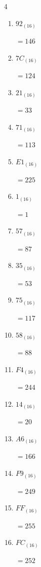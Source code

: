 \begin{multicols}{4}
\begin{enumerate}
  \item $92_{(16)}$

        $=146$

  \item $7C_{(16)}$

        $=124$

  \item $21_{(16)}$

        $=33$

  \item $71_{(16)}$

        $=113$

  \item $E1_{(16)}$

        $=225$

  \item $1_{(16)}$

        $=1$

  \item $57_{(16)}$

        $=87$

  \item $35_{(16)}$

        $=53$

  \item $75_{(16)}$

        $=117$

  \item $58_{(16)}$

        $=88$

  \item $F4_{(16)}$

        $=244$

  \item $14_{(16)}$

        $=20$

  \item $A6_{(16)}$

        $=166$

  \item $F9_{(16)}$

        $=249$

  \item $FF_{(16)}$

        $=255$

\columnbreak %

\resetques

  \item $FC_{(16)}$

        $=252$


\end{enumerate}
\end{multicols}
